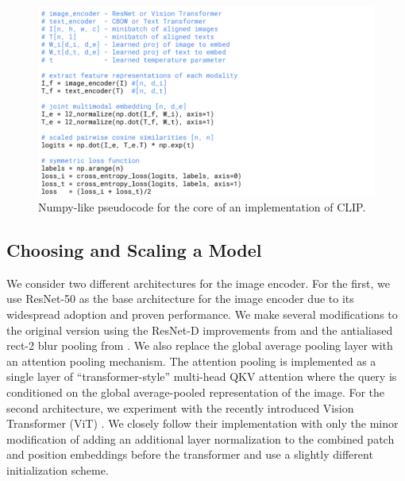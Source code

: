 \documentclass{article}
\begin{document}
\begin{figure}[t]
\begin{center}
\centerline{\includegraphics[width=1.0\columnwidth]{pseudocode.pdf}}
\caption{Numpy-like pseudocode for the core of an implementation of CLIP.}
\label{pseudocode}
\end{center}
\vspace{-1em}
\end{figure}


























\subsection{Choosing and Scaling a Model}

We consider two different architectures for the image encoder. For the first, we use ResNet-50 \citep{he2016deep} as the base architecture for the image encoder due to its widespread adoption and proven performance. We make several modifications to the original version using the ResNet-D improvements from \citet{he2019bag} and the antialiased rect-2 blur pooling from \citet{zhang2019making}. We also replace the global average pooling layer with an attention pooling mechanism. The attention pooling is implemented as a single layer of ``transformer-style'' multi-head QKV attention where the query is conditioned on the global average-pooled representation of the image. For the second architecture, we experiment with the recently introduced Vision Transformer (ViT) \citep{dosovitskiy2020image}. We closely follow their implementation with only the minor modification of adding an additional layer normalization to the combined patch and position embeddings before the transformer and use a slightly different initialization scheme.
\end{document}
